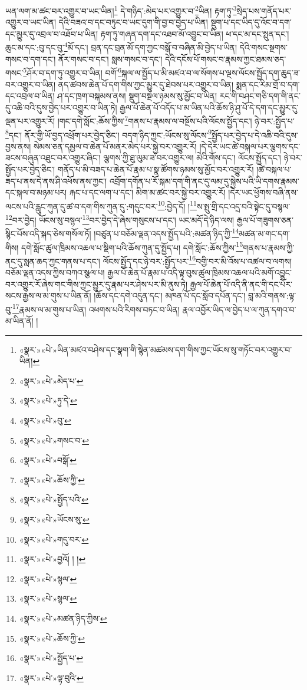 ཡན་ལག་མ་ཚང་བར་འགྱུར་བ་ཡང་ཡིན།\footnote{«སྣར་»«པེ་»ཡིན་མཛའ་བཤེས་དང་སྣག་གི་སྙེན་མཚམས་དག་གིས་ཀྱང་ཡོངས་སུ་གཏོང་བར་འགྱུར་བ་ཡིན།} དེ་གཉིད་:མེད་པར་འགྱུར་བ་\footnote{«སྣར་»«པེ་»མེད་པ་}ཡིན། རྟག་ཏུ་\footnote{«སྣར་»«པེ་»ཏུ་དེ་}སྲེད་པས་གནོད་པར་འགྱུར་བ་ཡང་ཡིན། དེའི་བཟའ་བ་དང་བཏུང་བ་ཡང་དུག་གི་བྱ་བ་བྱེད་པ་ཡིན། སྡུག་པ་དང་ཡིད་དུ་འོང་བ་དག་དང་མྱུར་དུ་འབྲལ་བ་འཐོབ་པ་ཡིན། རྟག་ཏུ་གཞན་དག་དང་འཐབ་མོ་འབྱུང་བ་ཡིན། ཕ་དང་མ་དང་སྤུན་དང་། ཆུང་མ་དང་:བུ་དང་བུ་\footnote{«སྣར་»«པེ་»བུ་}མོ་དང་། བྲན་དང་བྲན་མོ་དག་ཀྱང་བསྒོ་བ་བཞིན་མི་བྱེད་པ་ཡིན། དེའི་གསང་སྔགས་གསང་བ་དག་དང་། ནོར་གསང་བ་དང་། སླས་གསང་བ་དང་། དེའི་དངོས་པོ་གསང་བ་རྣམས་ཀྱང་ཐམས་ཅད་གསང་\footnote{«སྣར་»«པེ་»གསང་བ་}ཤོར་བ་དག་ཏུ་འགྱུར་བ་ཡིན། བགོ་\footnote{«སྣར་»«པེ་»བསྒོ་}སྐལ་ལ་སྤྱོད་པ་མི་མཛའ་བ་ལ་སོགས་པ་ལྔས་ལོངས་སྤྱོད་དག་ཆུད་ཟ་བར་འགྱུར་བ་ཡིན། ནད་ཚབས་ཆེན་པོ་དག་གིས་ཀྱང་མྱུར་དུ་ཐེབས་པར་འགྱུར་བ་ཡིན། སྨན་དང་རིམ་གྲོ་བ་དག་དང་འབྲལ་བ་ཡིན། ཤ་དང་ཁྲག་བསྐམས་ནས། སྡུག་བསྔལ་ཉམས་སུ་མྱོང་བ་ཡིན། རང་གི་བཤང་གཅི་དག་གི་ནང་དུ་འཆི་བའི་དུས་བྱེད་པར་འགྱུར་བ་ཡིན་ཏེ། རྒྱལ་པོ་ཆེན་པོ་འདོད་པ་མ་ཡིན་པའི་ཆོས་ཉི་ཤུ་པོ་དེ་དག་དང་མྱུར་དུ་ལྡན་པར་འགྱུར་རོ། །གང་དགེ་སློང་:ཆོས་ཀྱིས་\footnote{«སྣར་»«པེ་»ཆོས་ཀྱི་}གནས་པ་རྣམས་ལ་བསྔོས་པའི་ལོངས་སྤྱོད་དང་། ཉེ་བར་:སྤྱོད་པ་\footnote{«སྣར་»«པེ་»སྤྱོད་པའི་}དང་། ནོར་གྱི་ཡོ་བྱད་འཕྲོག་པར་བྱེད་ཅིང་། བདག་ཉིད་ཀྱང་:ཡོངས་སུ་ལོངས་\footnote{«སྣར་»«པེ་»ཡོངས་སུ་}སྤྱོད་པར་བྱེད་པ་དེ་འཆི་བའི་དུས་བྱས་ནས། སེམས་ཅན་དམྱལ་བ་ཆེན་པོ་མནར་མེད་པར་སྐྱེ་བར་འགྱུར་རོ། །དེ་དེར་ཡང་ཚེ་བསྐལ་པར་ལྕགས་དང་ཟངས་བཞུན་འཐུང་བར་འགྱུར་ཞིང་། ལྕགས་ཀྱི་ཐུ་ལུམ་ཟ་བར་འགྱུར་ལ། མེའི་གོས་དང་། ལོངས་སྤྱོད་དང་། ཉེ་བར་སྤྱོད་པར་བྱེད་ཅིང་། གནོད་པ་མི་བཟད་པ་ཆེན་པོ་རྣམ་པ་སྣ་ཚོགས་ཉམས་སུ་མྱོང་བར་འགྱུར་རོ། །ཚེ་བསྐལ་པ་ཟད་པ་ནས་དེ་ནས་ཤི་འཕོས་ནས་ཀྱང་། འབྲོག་དགོན་པ་རོ་སྐམ་དག་གི་ནང་དུ་ལམ་དུ་སྐྱེས་པའི་ཡི་དགས་རྣམས་དང་སྐལ་བ་མཉམ་པར། རྐང་པ་དང་ལག་པ་དང་། མིག་མ་ཚང་བར་སྐྱེ་བར་འགྱུར་རོ། །དེར་ཡང་ཕྱོགས་བཞི་ནས་ལངས་པའི་རླུང་ཀུན་དུ་ཚ་བ་དག་གིས་ཀུན་དུ་:གདུང་བར་\footnote{«སྣར་»«པེ་»གདུ་བར་}:བྱེད་དོ། །\footnote{«སྣར་»«པེ་»བྱའོ། ། །}ས་སྤུ་གྲི་དང་འདྲ་བའི་སྟེང་དུ་བསྙལ་\footnote{«སྣར་»«པེ་»སྙལ་}བར་བྱེད། ཡོངས་སུ་བསྙལ་\footnote{«སྣར་»«པེ་»སྙལ་}བར་བྱེད་དེ་ཞེས་གསུངས་པ་དང་། ཡང་མདོ་དེ་ཉིད་ལས། རྒྱལ་པོ་གཟུགས་ཅན་སྙིང་པོས་འདི་སྐད་ཅེས་གསོལ་ཏོ། །བཙུན་པ་བཅོམ་ལྡན་འདས་སྤྱོད་པའི་:མཚན་ཉིད་ཀྱི་\footnote{«སྣར་»«པེ་»མཚན་ཉིད་ཀྱིས་}མཚན་མ་གང་དག་གིས། དགེ་སློང་ཚུལ་ཁྲིམས་འཆལ་པ་སྡིག་པའི་ཆོས་ཀུན་དུ་སྤྱོད་པ། དགེ་སློང་:ཆོས་ཀྱིས་\footnote{«སྣར་»«པེ་»ཆོས་ཀྱི་}གནས་པ་རྣམས་ཀྱི་ནང་དུ་སླན་ཆད་ཀྱང་གནས་པ་དང་། ལོངས་སྤྱོད་དང་ཉེ་བར་:སྤྱོད་པར་\footnote{«སྣར་»«པེ་»སྤྱོད་པ་}བགྱི་བར་མི་འོས་པ་འཚལ་བ་ལགས། བཅོམ་ལྡན་འདས་ཀྱིས་བཀའ་སྩལ་པ། རྒྱལ་པོ་ཆེན་པོ་རྣམ་པ་འདི་ལྟ་བུས་ཚུལ་ཁྲིམས་འཆལ་པའི་མགོ་འབྱུང་བར་འགྱུར་རོ་ཞེས་གང་གིས་ཀྱང་མྱུར་དུ་རྣམ་པར་ཤེས་པར་མི་ནུས་ཏེ། རྒྱལ་པོ་ཆེན་པོ་འདི་ནི་ནང་གི་དང་པོར་སངས་རྒྱས་ལ་མ་གུས་པ་ཡིན་ནོ། །ཆོས་དང་དགེ་འདུན་དང་། མཁན་པོ་དང་སློབ་དཔོན་དང་། བླ་མའི་གནས་:ལྟ་བུ་\footnote{«སྣར་»«པེ་»ལྟ་བུའི་}རྣམས་ལ་མ་གུས་པ་ཡིན། འཕགས་པའི་རིགས་བཏང་བ་ཡིན། རྣལ་འབྱོར་ཡིད་ལ་བྱེད་པ་ལ་ཀུན་དགའ་བ་མ་ཡིན་ནོ། །
